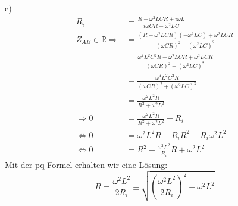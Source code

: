 \documentclass[11pt a4paper]{article}
\begin{document}
\newpage
\setlength{\headheight}{0cm}

c) 
\begin{align*}
	R_i
	&= \frac{R - \omega^2 LCR + i \omega L}{i\omega CR - \omega^2 LC} \\
	Z_{AB} \in \mathbb{R} \Rightarrow
	&= \frac{(R - \omega^2 LCR) (-\omega^2 LC) + \omega^2 LCR}{(\omega CR)^2 + (\omega^2 LC)^2} \\
	&= \frac{\omega^4 L^2 C^2 R - \omega^2 LCR + \omega^2 LCR}{(\omega CR)^2 + (\omega^2 LC)^2} \\
	&= \frac{\omega^4 L^2 C^2 R}{(\omega CR)^2 + (\omega^2 LC)^2} \\
	&= \frac{\omega^2 L^2 R}{R^2 + \omega^2 L^2} \\
	\Rightarrow
	0
	&= \frac{\omega^2 L^2 R}{R^2 + \omega^2 L^2} - R_i \\
	\Leftrightarrow
	0
	&= \omega^2 L^2 R - R_iR^2 - R_i\omega^2L^2 \\
	\Leftrightarrow
	0
	&= R^2 - \frac{\omega^2L^2}{R_i} R + \omega^2 L^2
\end{align*}
Mit der pq-Formel erhalten wir eine Lösung:
\[
	R = \frac{\omega^2L^2}{2 R_i} \pm \sqrt{\left( \frac{\omega^2L^2}{2 R_i}\right)^2 - \omega^2 L^2} 
\]


\newpage
\setlength{\headheight}{0cm}
\end{document}
